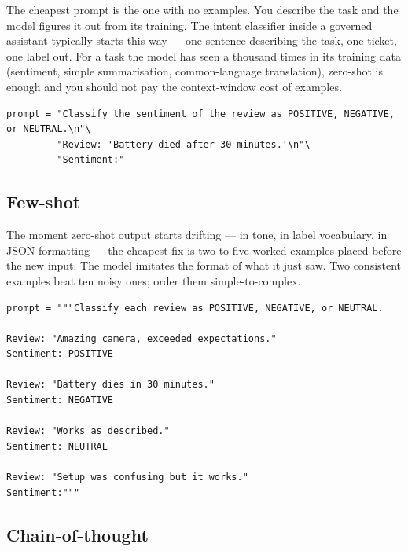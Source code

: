 The cheapest prompt is the one with no examples. You describe the task and the model figures it out from its training. The intent classifier inside a governed assistant typically starts this way --- one sentence describing the task, one ticket, one label out. For a task the model has seen a thousand times in its training data (sentiment, simple summarisation, common-language translation), zero-shot is enough and you should not pay the context-window cost of examples.

\begin{examplebox}[title=\textbf{Zero-shot classification}]
\begin{lstlisting}[style=pythonstyle]
prompt = "Classify the sentiment of the review as POSITIVE, NEGATIVE, or NEUTRAL.\n"\
         "Review: 'Battery died after 30 minutes.'\n"\
         "Sentiment:"
\end{lstlisting}
\end{examplebox}

\subsection{Few-shot}

The moment zero-shot output starts drifting --- in tone, in label vocabulary, in JSON formatting --- the cheapest fix is two to five worked examples placed before the new input. The model imitates the format of what it just saw. Two consistent examples beat ten noisy ones; order them simple-to-complex.

\begin{examplebox}[title=\textbf{Few-shot classification with explicit labels}]
\begin{lstlisting}[style=pythonstyle]
prompt = """Classify each review as POSITIVE, NEGATIVE, or NEUTRAL.

Review: "Amazing camera, exceeded expectations."
Sentiment: POSITIVE

Review: "Battery dies in 30 minutes."
Sentiment: NEGATIVE

Review: "Works as described."
Sentiment: NEUTRAL

Review: "Setup was confusing but it works."
Sentiment:"""
\end{lstlisting}
\end{examplebox}

\subsection{Chain-of-thought}

